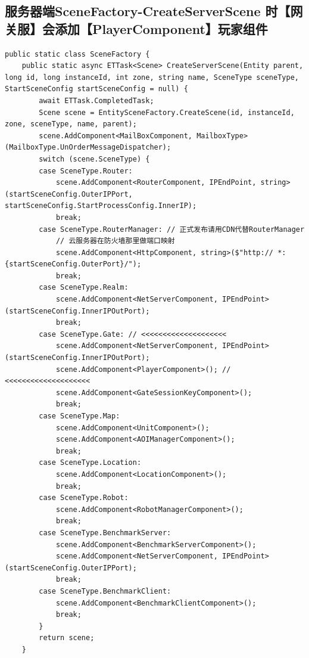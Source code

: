\documentclass[9pt, b5paper]{article}
\begin{document}
\subsection{服务器端SceneFactory-CreateServerScene 时【网关服】会添加【PlayerComponent】玩家组件}
\label{sec-9-5}
\begin{verbatim}
public static class SceneFactory {
    public static async ETTask<Scene> CreateServerScene(Entity parent, long id, long instanceId, int zone, string name, SceneType sceneType, StartSceneConfig startSceneConfig = null) {
        await ETTask.CompletedTask;
        Scene scene = EntitySceneFactory.CreateScene(id, instanceId, zone, sceneType, name, parent);
        scene.AddComponent<MailBoxComponent, MailboxType>(MailboxType.UnOrderMessageDispatcher);
        switch (scene.SceneType) {
        case SceneType.Router:
            scene.AddComponent<RouterComponent, IPEndPoint, string>(startSceneConfig.OuterIPPort, startSceneConfig.StartProcessConfig.InnerIP);
            break;
        case SceneType.RouterManager: // 正式发布请用CDN代替RouterManager
            // 云服务器在防火墙那里做端口映射
            scene.AddComponent<HttpComponent, string>($"http:// *:{startSceneConfig.OuterPort}/");
            break;
        case SceneType.Realm:
            scene.AddComponent<NetServerComponent, IPEndPoint>(startSceneConfig.InnerIPOutPort);
            break;
        case SceneType.Gate: // <<<<<<<<<<<<<<<<<<<< 
            scene.AddComponent<NetServerComponent, IPEndPoint>(startSceneConfig.InnerIPOutPort);
            scene.AddComponent<PlayerComponent>(); // <<<<<<<<<<<<<<<<<<<< 
            scene.AddComponent<GateSessionKeyComponent>();
            break;
        case SceneType.Map:
            scene.AddComponent<UnitComponent>();
            scene.AddComponent<AOIManagerComponent>();
            break;
        case SceneType.Location:
            scene.AddComponent<LocationComponent>();
            break;
        case SceneType.Robot:
            scene.AddComponent<RobotManagerComponent>();
            break;
        case SceneType.BenchmarkServer:
            scene.AddComponent<BenchmarkServerComponent>();
            scene.AddComponent<NetServerComponent, IPEndPoint>(startSceneConfig.OuterIPPort);
            break;
        case SceneType.BenchmarkClient:
            scene.AddComponent<BenchmarkClientComponent>();
            break;
        }
        return scene;
    }
\end{verbatim}
\end{document}
